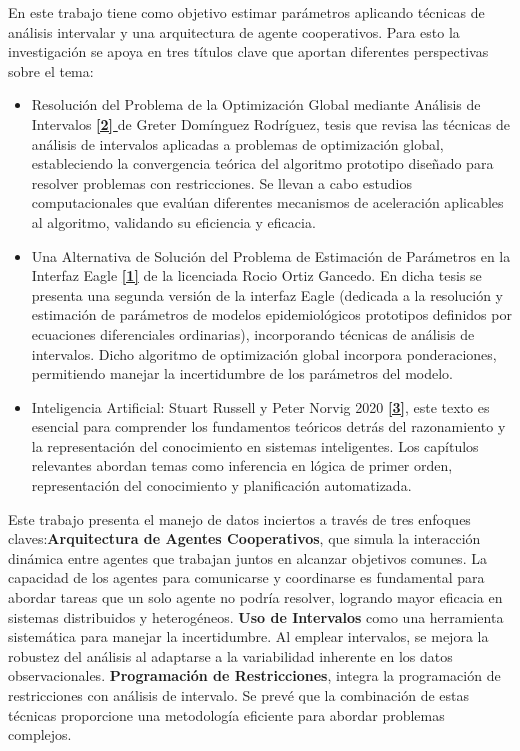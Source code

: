 \documentclass{article}
\begin{document}
En este trabajo tiene como objetivo estimar parámetros aplicando técnicas de análisis intervalar y una arquitectura de agente cooperativos. Para esto la investigación se apoya en tres títulos clave que aportan diferentes perspectivas sobre el tema:
\begin{itemize}
\item Resolución del Problema de la Optimización Global mediante Análisis de Intervalos \hyperref[sec:2]{ \textbf{[2] }} de Greter Domínguez Rodríguez, tesis que revisa las técnicas de análisis de intervalos aplicadas a problemas de optimización global, estableciendo la convergencia teórica del algoritmo prototipo diseñado para resolver problemas con restricciones. Se llevan a cabo estudios computacionales que evalúan diferentes mecanismos de aceleración aplicables al algoritmo, validando su eficiencia y eficacia.

\item Una Alternativa de Solución del Problema de Estimación de Parámetros en la Interfaz Eagle \hyperref[sec:1]{ \textbf{ [1]}} de la licenciada Rocio Ortiz Gancedo. En dicha tesis se presenta una segunda versión de la interfaz Eagle (dedicada a la resolución y estimación de parámetros de modelos epidemiológicos prototipos definidos por ecuaciones diferenciales ordinarias), incorporando técnicas de análisis de intervalos. Dicho algoritmo de optimización global incorpora ponderaciones, permitiendo manejar la incertidumbre de los parámetros del modelo.

\item Inteligencia Artificial: Stuart Russell y Peter Norvig 2020 \hyperref[sec:3]{ \textbf{[3]}}, este texto es esencial para comprender los fundamentos teóricos detrás del razonamiento y la representación del conocimiento en sistemas inteligentes. Los capítulos relevantes abordan temas como inferencia en lógica de primer orden, representación del conocimiento y planificación automatizada.

\end{itemize}
    
Este trabajo presenta el manejo de datos inciertos a través de tres enfoques claves:\textbf{Arquitectura de Agentes Cooperativos}, que simula la interacción dinámica entre agentes que trabajan juntos en alcanzar objetivos comunes. La capacidad de los agentes para comunicarse y coordinarse es fundamental para abordar tareas que un solo agente no podría resolver, logrando mayor eficacia en sistemas distribuidos y heterogéneos. \textbf{Uso de Intervalos} como una herramienta sistemática para manejar la incertidumbre. Al emplear intervalos, se mejora la robustez del análisis al adaptarse a la variabilidad inherente en los datos observacionales. \textbf{Programación de Restricciones}, integra la programación de restricciones con análisis de intervalo. Se prevé que la combinación de estas técnicas proporcione una metodología eficiente para abordar problemas complejos. 
\end{document}
